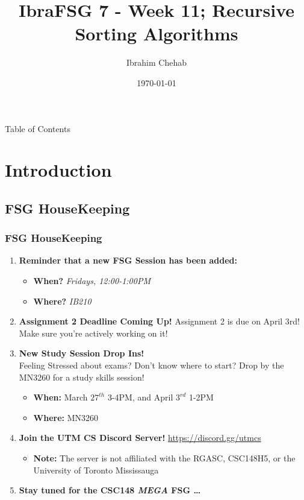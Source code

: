 \documentclass[hyperref={colorlinks,citecolor=blue,linkcolor=blue,urlcolor=blue}, aspectratio=1610]{beamer}
\title[IbraFSG 7: Recursive Sorting]{IbraFSG\texttrademark{} 7 - Week 11; Recursive Sorting Algorithms}
\author{Ibrahim Chehab}
\institute{UTM RGASC}
\date{\today}
\begin{document}
\begin{frame}
  \titlepage
\end{frame}

\begin{frame}{Table of Contents}
  \tableofcontents
\end{frame}

\section{Introduction}

\subsection{FSG HouseKeeping}
\begin{frame}
  \frametitle{FSG HouseKeeping}
  \begin{enumerate}
    \item \textbf{Reminder that a new FSG Session has been added:}
    \begin{itemize}
      \item \textbf{When?} \textit{Fridays, 12:00-1:00PM}
      \item \textbf{Where?} \textit{IB210}
    \end{itemize}
    \pause
    \item \textbf{Assignment 2 Deadline Coming Up!} Assignment 2 is due on April 3rd! Make sure you're actively working on it!
    \pause
    \item \textbf{New Study Session Drop Ins!} \\ Feeling Stressed about exams? Don't know where to start? Drop by the MN3260 for a study skills session! 
    \begin{itemize}
      \item \textbf{When:} March $27^{th}$ 3-4PM, and April $3^{rd}$ 1-2PM
      \item \textbf{Where:} MN3260
    \end{itemize}
    \pause
    \item \textbf{Join the UTM CS Discord Server!} \url{https://discord.gg/utmcs}
    \begin{itemize}
      \item \textbf{Note:} The server is not affiliated with the RGASC, CSC148H5, or the University of Toronto Mississauga
    \end{itemize}
    \item \textbf{Stay tuned for the CSC148 \textit{MEGA} FSG \dots}
  \end{enumerate}

\end{frame}
\end{document}

